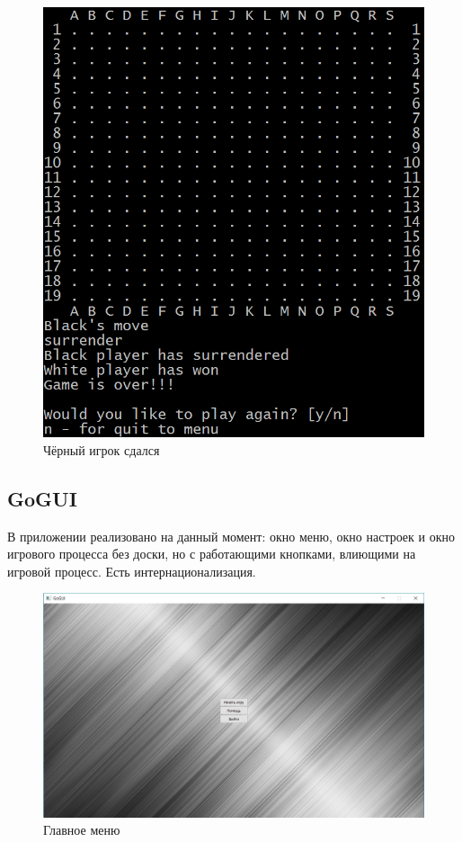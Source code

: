 \begin{figure}[H]
	\begin{center}
		\includegraphics[scale=0.6]{pics/GoCUI/Surrender.png}
	    \caption{Чёрный игрок сдался} 
		\label{pic:CUI_Surrender}
	\end{center}
\end{figure}

\subsection*{GoGUI}

В приложении реализовано на данный момент: окно меню, окно настроек и окно игрового процесса без доски, но с работающими кнопками,
влиющими на игровой процесс. Есть интернационализация.

\begin{figure}[H]
	\begin{center}
		\includegraphics[scale=0.5]{pics/GoGUI/Menu.png}
	    \caption{Главное меню} 
		\label{pic:CUI_Menu}
	\end{center}
\end{figure}

